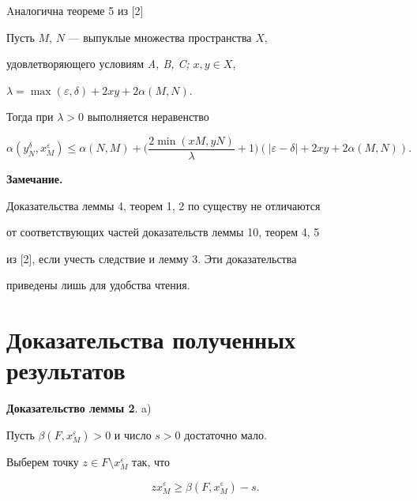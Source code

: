 Aналогична теореме 5 из [2]





\begin{thm}


Пусть $M$, $N$ --- выпуклые множества пространства $X$, 


удовлетворяющего условиям {\em A, B, C;} $x,  y \in X$,


$\lambda =\max (\varepsilon,\delta) + 2xy + 2\alpha (M,N)$.


Тогда при $\lambda > 0$ выполняется неравенство


\begin{equation}


\alpha (y_{N}^{\delta },x_{M}^{\varepsilon }) \leq \alpha (N,M) + 


\bigg(\frac{2\min (xM,yN)}{\lambda } + 1\bigg)(|\varepsilon - \delta |


+ 2xy + 2\alpha (M,N)).


\end{equation}


\end{thm}





{\bf Замечание.}


Доказательства леммы 4, теорем 1, 2 по существу не отличаются


от соответствующих частей доказательств леммы 10, теорем 4, 5


из [2], если учесть следствие и лемму 3. Эти доказательства


приведены лишь для удобства чтения.





\section{Доказательства полученных результатов}





{\bf Доказательство леммы 2}. a) 


Пусть $\beta (F,x_{M}^{\varepsilon }) > 0$ и число $s > 0$ достаточно мало.


Выберем точку $z \in F \setminus x_{M}^{\varepsilon }$ так, что 


\begin{equation}


zx_{M}^{\varepsilon } \geq \beta (F,x_{M}^{\varepsilon }) - s.


\end{equation}


